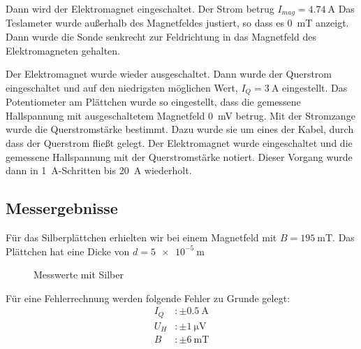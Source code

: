 Dann wird der Elektromagnet eingeschaltet. Der Strom betrug $I_{mag} = \SI{4.74}{\ampere}$
Das Teslameter wurde außerhalb des Magnetfeldes justiert, so dass es \SI{0}{\milli\tesla} anzeigt.
Dann wurde die Sonde senkrecht zur Feldrichtung in das Magnetfeld des Elektromagneten gehalten.

Der Elektromagnet wurde wieder ausgeschaltet. Dann wurde der Querstrom eingeschaltet und auf den niedrigsten möglichen Wert, $I_Q = \SI{3}{\ampere}$ eingestellt. Das Potentiometer am Plättchen wurde so eingestellt, dass die gemessene Hallspannung mit ausgeschaltetem Magnetfeld \SI{0}{\milli\volt} betrug. Mit der Stromzange wurde die Querstromstärke bestimmt. Dazu wurde sie um eines der Kabel, durch dass der Querstrom fließt gelegt. Der Elektromagnet wurde eingeschaltet und die gemessene Hallspannung mit der Querstromstärke notiert. Dieser Vorgang wurde dann in \SI{1}{\ampere}-Schritten bis \SI{20}{\ampere} wiederholt.

\subsection{Messergebnisse}
Für das Silberplättchen erhielten wir bei einem Magnetfeld mit $B = \SI{195}{\milli\tesla}$. Das Plättchen hat eine Dicke von $d = \SI{5e-5}{\meter}$

\begin{figure}[H]
\centering
{}
\caption{Messwerte mit Silber}
\end{figure}

Für eine Fehlerrechnung werden folgende Fehler zu Grunde gelegt:
\begin{align*}
I_Q &: \pm \SI{0.5}{\ampere} \\
U_H &: \pm \SI{1}{\micro\volt} \\
B &: \pm \SI{6}{\milli\tesla} \\
\end{align*}

